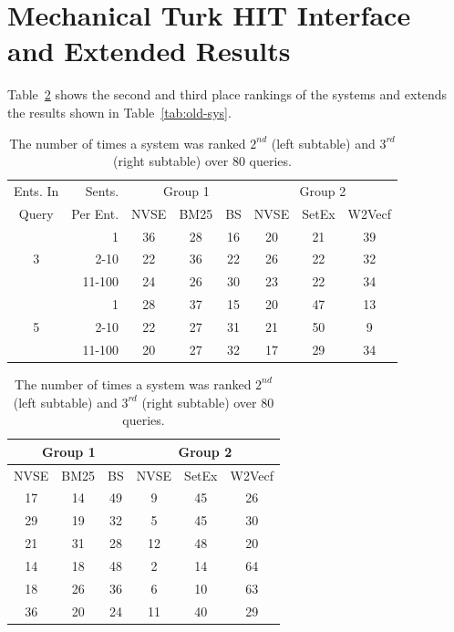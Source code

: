 \documentclass[a4paper]{article}
\newcommand{\tabref}[1]{Table~\ref{#1}}
\newcommand{\nvge}{NVSE\xspace}
\begin{document}
\section{Mechanical Turk HIT Interface and Extended Results} 
\label{app:mturk-hit}
Table~\ref{tab:old-sys-23} shows the second and third place rankings of the systems and extends the results shown in \tabref{tab:old-sys}.
\begin{table}[htbp]%
  \setlength{\tabcolsep}{1.75pt}
  \centering
\begin{tabular}{|c@{\hskip 1pt}|r|ccc||ccc|}\hline
  {\small Ents$.$ In}  & {\small Sents. }  &          \multicolumn{3}{c||}{Group 1}      &          \multicolumn{3}{c|}{Group 2}       \\[-2pt]\cline{3-8}
  {\small Query} & {\small Per Ent.} & {\small \nvge}    & {\small BM25}    & {\small BS}  & {\small \nvge}    & {\small SetEx}   & {\small W2Vecf} \\\hline
  & 1      & 36 & 28 & 16 & 20 & 21 & 39 \\[-1pt]
3 & 2-10   & 22 & 36 & 22 & 26 & 22 & 32 \\[-1pt]
  & 11-100 & 24 & 26 & 30 & 23 & 22 & 34 \\[-1pt]\hline
  & 1      & 28 & 37 & 15 & 20 & 47 & 13 \\[-1pt]
5 & 2-10   & 22 & 27 & 31 & 21 & 50 & 9  \\[-1pt]
  & 11-100 & 20 & 27 & 32 & 17 & 29 & 34 \\[-1pt]\hline
\end{tabular}
\begin{tabular}{|ccc||ccc|}\hline
\multicolumn{3}{|c||}{Group 1}      &          \multicolumn{3}{c|}{Group 2}       \\[-2pt]\hline
{\small \nvge}    & {\small BM25}    & {\small BS}  & {\small \nvge}    & {\small SetEx}   & {\small W2Vecf} \\\hline
 17 & 14 & 49 & 9  & 45 & 26 \\[-1pt]
 29 & 19 & 32 & 5  & 45 & 30 \\[-1pt]
 21 & 31 & 28 & 12 & 48 & 20 \\[-1pt]\hline
 14 & 18 & 48 & 2  & 14 & 64 \\[-1pt]
 18 & 26 & 36 & 6  & 10 & 63 \\[-1pt]
 36 & 20 & 24 & 11 & 40 & 29 \\[-1pt]\hline
\end{tabular}
\caption{The number of times a system was ranked $2^{nd}$ (left subtable) and $3^{rd}$ (right subtable) over 80 queries. }
\label{tab:old-sys-23}
\end{table}
\end{document}
